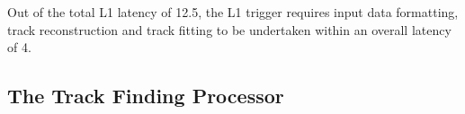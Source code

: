 Out of the total L1 latency of 12.5\mus, the L1 trigger requires input data formatting, track reconstruction and track fitting to be undertaken within an overall latency of 4\mus.




\subsection{The Track Finding Processor}
%
%


